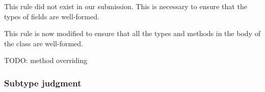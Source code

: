 This rule did not exist in our submission. This is necessary to ensure
that the types of fields are well-formed.



This rule is now modified to ensure that all the types and methods in
the body of the class are well-formed.


TODO: method overriding


\subsubsection{
        Subtype judgment
}





